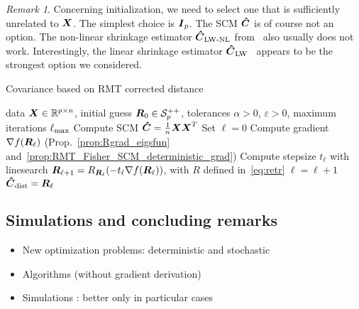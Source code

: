 \documentclass{article}
\theoremstyle{plain}
\theoremstyle{definition}
\theoremstyle{remark}
\newtheorem{remark}[theorem]{Remark}
\begin{document}
\begin{remark}
    Concerning initialization, we need to select one that is sufficiently unrelated to $\boldsymbol{X}$.
    The simplest choice is $\boldsymbol{I}_{p}$.
    The SCM $\boldsymbol{\hat{C}}$ is of course not an option.
    The non-linear shrinkage estimator $\boldsymbol{\hat{C}}_{\textup{LW-NL}}$ from~\cite{ledoit2020analytical} also usually does not work.
    Interestingly, the linear shrinkage estimator $\boldsymbol{\hat{C}}_{\textup{LW}}$~\cite{ledoit2004well} appears to be the strongest option we considered.
\end{remark}

\begin{algorithm}
    \caption{Covariance based on RMT corrected distance}
    \label{algo:RMTCov}
    \begin{algorithmic}
            data $\boldsymbol{X}\in\mathbb{R}^{p\times n}$,
            initial guess $\boldsymbol{R}_0\in\mathcal{S}^{++}_{p}$,
            tolerances $\alpha>0$, $\varepsilon>0$,
            maximum iterations $\ell_{\textup{max}}$
        \STATE Compute SCM $\boldsymbol{\hat{C}}=\frac1{n}\boldsymbol{X}\boldsymbol{X}^T$
        \STATE Set $\ell=0$
        \REPEAT
        \STATE Compute gradient $\nabla f(\boldsymbol{R}_{\ell})$ (Prop.~\ref{prop:Rgrad_eigsfun} and~\ref{prop:RMT_Fisher_SCM_deterministic_grad})
        \STATE Compute stepsize $t_{\ell}$ with linesearch
        \STATE $\boldsymbol{R}_{\ell+1} = R_{\boldsymbol{R}_{\ell}}(-t_{\ell}\nabla f(\boldsymbol{R}_{\ell}))$, with $R$ defined in~\eqref{eq:retr}
        \STATE $\ell=\ell+1$
         $\boldsymbol{\hat{C}}_{\textup{dist}}=\boldsymbol{R}_{\ell}$
    \end{algorithmic}
\end{algorithm}

\subsection{Simulations and concluding remarks}


\begin{itemize}
    \item New optimization problems: deterministic and stochastic
    \item Algorithms (without gradient derivation)
    \item Simulations : better only in particular cases
\end{itemize}
\end{document}
